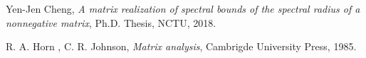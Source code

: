 \documentclass[12pt, a4paper]{article}
\theoremstyle{plain}
\theoremstyle{definition}
\begin{document}
\begin{thebibliography}{20}
\normalsize
{}

Yen-Jen Cheng, {\it  A matrix realization of spectral bounds
of the spectral radius of a nonnegative matrix}, Ph.D. Thesis, NCTU, 2018.

R. A. Horn , C. R. Johnson, {\it Matrix analysis}, Cambrigde University Press, 1985.
\end{thebibliography}
\end{document}
